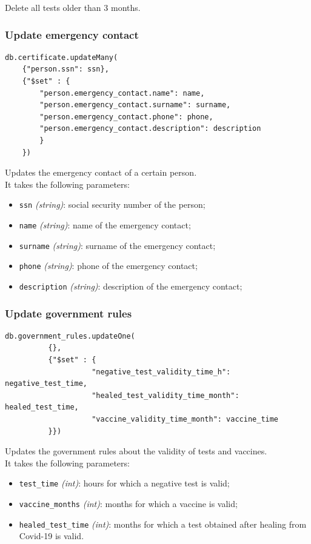\documentclass[12pt, a4paper]{article}
\begin{document}
\noindent
Delete all tests older than 3 months.

\subsubsection{Update emergency contact}
\begin{tcolorbox}[fontupper=\scriptsize]
    \begin{verbatim}
db.certificate.updateMany(
	{"person.ssn": ssn},
	{"$set" : {
		"person.emergency_contact.name": name,
		"person.emergency_contact.surname": surname,
		"person.emergency_contact.phone": phone,
		"person.emergency_contact.description": description	
		}
	})
      \end{verbatim}
\end{tcolorbox}

\noindent
Updates the emergency contact of a certain person. \\
It takes the following parameters:
\begin{itemize}
    \item \texttt{ssn} \emph{(string)}: social security number of the person;
    \item \texttt{name} \emph{(string)}: name of the emergency contact;
    \item \texttt{surname} \emph{(string)}: surname of the emergency contact;
    \item \texttt{phone} \emph{(string)}: phone of the emergency contact;
    \item \texttt{description} \emph{(string)}: description of the emergency contact;
 \end{itemize}

\subsubsection{Update government rules} 
\begin{tcolorbox}[fontupper=\scriptsize]
    \begin{verbatim}
db.government_rules.updateOne(
          {},
          {"$set" : { 
                    "negative_test_validity_time_h": negative_test_time,
                    "healed_test_validity_time_month": healed_test_time, 
                    "vaccine_validity_time_month": vaccine_time
          }})
      \end{verbatim}
\end{tcolorbox}

\noindent
Updates the government rules about the validity of tests and vaccines. \\
It takes the following parameters:
\begin{itemize}
    \item \texttt{test\_time} \emph{(int)}: hours for which a negative test is valid;
    \item \texttt{vaccine\_months} \emph{(int)}: months for which a vaccine is valid;
    \item \texttt{healed\_test\_time} \emph{(int)}: months for which a test obtained after 
        healing from Covid-19 is valid.
 \end{itemize}
\end{document}

